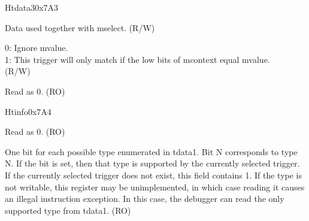 \begin{register}{H}{tdata3}{0x7A3}\label{regdesc:TDATA3}
%
%
%
\regnewline%
\begin{regdesc}\begin{reglist}
\label{fielddesc:MVALUE}\item [mvalue] Data used together with mselect. (R/W)
\label{fielddesc:MSELECT}\item [mselect] 
0: Ignore mvalue. \\
1: This trigger will only match if the low bits of mcontext equal mvalue. \\
(R/W)
\label{fielddesc:tdata3_rsvd}\item [Reserved] Read as 0. (RO)
\end{reglist}\end{regdesc}
\end{register}

\begin{register}{H}{tinfo}{0x7A4}\label{regdesc:TINFO}
%
%
\regnewline%
\begin{regdesc}\begin{reglist}
\label{fielddesc:tinfo_rsvd}\item [Reserved] Read as 0. (RO)
\label{fielddesc:INFO}\item [info] One bit for each possible type enumerated in tdata1. Bit N corresponds to type N. If the bit is set, then that type is supported by the currently selected trigger. If the currently selected trigger does not exist, this field contains 1. If the type is not writable, this register may be unimplemented, in which case reading it causes an illegal instruction exception. In this case, the debugger can read the only supported type from tdata1. (RO)
\end{reglist}\end{regdesc}
\end{register}


